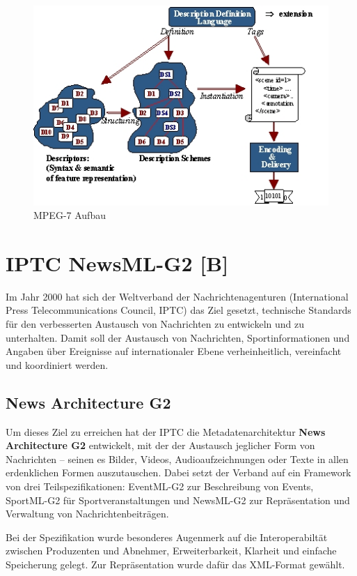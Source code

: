 \begin{figure}[h]
	\includegraphics [scale=0.55]{image004.jpg}
	\caption {MPEG-7 Aufbau}
\end{figure}

	\newpage
	\section{IPTC NewsML-G2 \hfill [B]}
	Im Jahr 2000 hat sich der Weltverband der Nachrichtenagenturen (International Press Telecommunications Council, IPTC) das Ziel gesetzt, technische Standards für den verbesserten Austausch von Nachrichten zu entwickeln und zu unterhalten. Damit soll der Austausch von Nachrichten, Sportinformationen und Angaben über Ereignisse auf internationaler Ebene verheinheitlich, vereinfacht und koordiniert werden.
	
	\subsection{News Architecture G2}
	Um dieses Ziel zu erreichen hat der IPTC die Metadatenarchitektur \textbf{News Architecture G2} entwickelt, mit der der Austausch jeglicher Form von Nachrichten -- seinen es Bilder, Videos, Audioaufzeichnungen oder Texte in allen erdenklichen Formen auszutauschen. Dabei setzt der Verband auf ein Framework von drei Teilspezifikationen: EventML-G2 zur Beschreibung von Events, SportML-G2 für Sportveranstaltungen und NewsML-G2 zur Repräsentation und Verwaltung von Nachrichtenbeiträgen.
	
	Bei der Spezifikation wurde besonderes Augenmerk auf die Interoperabiltät zwischen Produzenten und Abnehmer, Erweiterbarkeit, Klarheit und einfache Speicherung gelegt. Zur Repräsentation wurde dafür das XML-Format gewählt.
	
